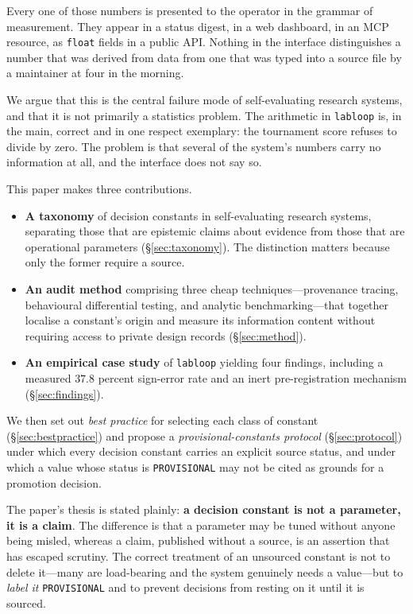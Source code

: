 \documentclass[10pt,twocolumn,letterpaper]{article}
\newcommand{\code}[1]{\texttt{#1}}
\begin{document}
Every one of those numbers is presented to the operator in the grammar of measurement. They
appear in a status digest, in a web dashboard, in an MCP resource, as \code{float} fields in a
public API. Nothing in the interface distinguishes a number that was derived from data from one
that was typed into a source file by a maintainer at four in the morning.

We argue that this is the central failure mode of self-evaluating research systems, and that it
is not primarily a statistics problem. The arithmetic in \code{labloop} is, in the main, correct and
in one respect exemplary: the tournament score refuses to divide by zero. The problem is that
several of the system's numbers carry no information at all, and the interface does not say so.

This paper makes three contributions.

\begin{itemize}
\item \textbf{A taxonomy} of decision constants in self-evaluating research systems, separating
those that are epistemic claims about evidence from those that are operational parameters
(\S\ref{sec:taxonomy}). The distinction matters because only the former require a source.
\item \textbf{An audit method} comprising three cheap techniques---provenance tracing, behavioural
differential testing, and analytic benchmarking---that together localise a constant's origin and
measure its information content without requiring access to private design records
(\S\ref{sec:method}).
\item \textbf{An empirical case study} of \code{labloop} yielding four findings, including a
measured $37.8$ percent sign-error rate and an inert pre-registration mechanism
(\S\ref{sec:findings}).
\end{itemize}

We then set out \emph{best practice} for selecting each class of constant (\S\ref{sec:bestpractice})
and propose a \emph{provisional-constants protocol} (\S\ref{sec:protocol}) under which every
decision constant carries an explicit source status, and under which a value whose status is
\code{PROVISIONAL} may not be cited as grounds for a promotion decision.

The paper's thesis is stated plainly: \textbf{a decision constant is not a parameter, it is a
claim}. The difference is that a parameter may be tuned without anyone being misled, whereas a
claim, published without a source, is an assertion that has escaped scrutiny. The correct treatment
of an unsourced constant is not to delete it---many are load-bearing and the system genuinely needs
a value---but to \emph{label it} \code{PROVISIONAL} and to prevent decisions from resting on it
until it is sourced.
\end{document}
